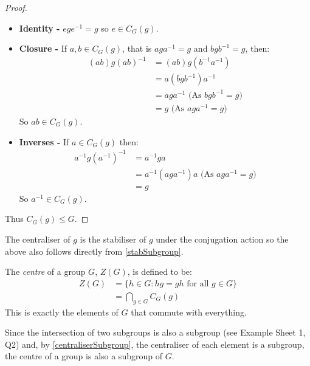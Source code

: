 \documentclass[../main.tex]{subfiles}
\begin{document}
\begin{proof}
  \begin{itemize}
    \item \textbf{Identity -} $ege^{-1} = g$ so $e \in C_G(g)$.
    \item \textbf{Closure -} If $a, b \in C_G(g)$, that is $aga^{-1} = g$ and $bgb^{-1} = g$, then:
      \begin{align*}
        (ab)g(ab)^{-1} &= (ab)g(b^{-1}a^{-1}) \\
                       &= a (bgb^{-1}) a^{-1} \\
                       &= a g a^{-1} \text{ (As $bgb^{-1} = g$)}\\
                       &= g \text{ (As $aga^{-1} = g$)}
      \end{align*}
      So $ab \in C_G(g)$.
    \item \textbf{Inverses -} If $a \in C_G(g)$ then:
      \begin{align*}
        a^{-1} g (a^{-1})^{-1} &= a^{-1} g a \\
                               &= a^{-1} (a g a^{-1}) a \text{ (As $aga^{-1} = g$)} \\
                               &= g
      \end{align*}
      So $a^{-1} \in C_G(g)$.
  \end{itemize}
  Thus $C_G(g) \leq G$.
\end{proof}
\begin{remark}
  The centraliser of $g$ is the stabiliser of $g$ under the conjugation action so the above also follows directly from \cref{stabSubgroup}.
\end{remark}
\begin{definition}
  The \textit{centre} of a group $G$, $Z(G)$, is defined to be:
  \begin{align*}
    Z(G) &= \{h \in G : hg = gh \text{ for all } g \in G\} \\
         &= \bigcap_{g \in G} C_G(g)
  \end{align*}
  This is exactly the elements of $G$ that commute with everything.
\end{definition}
\begin{remark}
  Since the intersection of two subgroups is also a subgroup (see Example Sheet 1, Q2) and, by \cref{centraliserSubgroup}, the centraliser of each element is a subgroup, the centre of a group is also a subgroup of $G$.
\end{remark}
\end{document}
